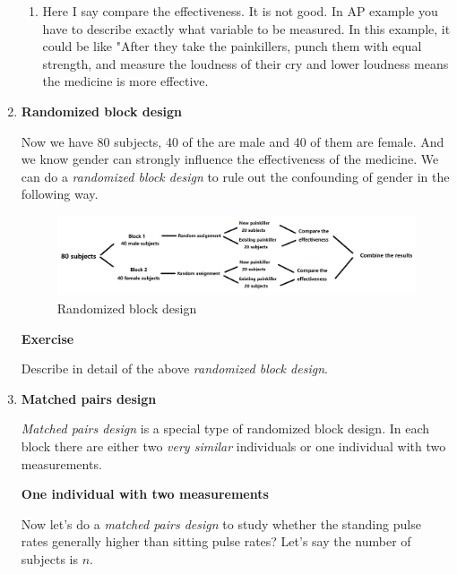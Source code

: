\documentclass[a4paper, 12pt,twoside]{book}
\begin{document}
\begin{enumerate}[(1)]
{{\begin{enumerate}[\Roman*.]
         \item Here I say compare the effectiveness. It is not good. In AP example you have to describe exactly what variable to be measured. In this example, it could be like "After they take the painkillers, punch them with equal strength, and measure the loudness of their cry and lower loudness means the medicine is more effective.        
     \end{enumerate}
     }} 
     \vspace{0.3cm}   
     
  \item \textbf{Randomized block design} 
  
  Now we have 80 subjects, 40 of the are male and 40 of them are female. And we know gender can strongly influence the effectiveness of the medicine. We can do a \textit{randomized block design} to rule out the confounding of gender in the following way.
  \begin{figure}[H]
      \centering
      \includegraphics[scale=0.6]{RandomizedBlockDesign}
      \caption{Randomized block design 
      \label{RandomizedBlockDesign}}
  \end{figure}
  
\colorbox{champagne}{\parbox{0.9\textwidth}{
\textbf{Exercise}

 Describe in detail of the above \textit{randomized block design}.
 }}
 \newpage
 \item \textbf{Matched pairs design}
  \vspace{0.3cm}
  
  \textit{Matched pairs design} is a special type of randomized block design. In each block there are either two \textit{very similar} individuals or one individual with two measurements. 
  \vspace{0.3cm}
  
  \textbf{One individual with two measurements}
  \vspace{0.3cm}
  
  Now let's do a \textit{matched pairs design} to study whether the standing pulse rates generally higher than sitting pulse rates? Let's say the number of subjects is $n$.
  \vspace{0.3cm}
  

\end{enumerate}
\end{document}
